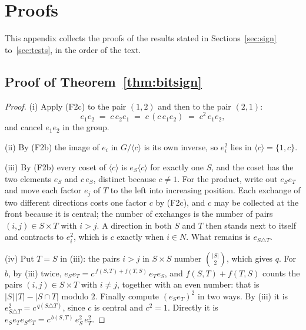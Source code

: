 \documentclass[11pt]{article}
\theoremstyle{plain}
\theoremstyle{definition}
\theoremstyle{plain}
\theoremstyle{definition}
\begin{document}
\appendix
\section{Proofs}\label{app:proofs}

This appendix collects the proofs of the results stated in Sections~\ref{sec:sign} to~\ref{sec:tests}, in the order of the text.

\subsection{\texorpdfstring{Proof of Theorem~\ref{thm:bitsign}}{Proof of Theorem 3.1}}\label{prf:thm:bitsign}

\begin{proof}
(i) Apply (F2c) to the pair $(1,2)$ and then to the pair $(2,1)$:
\[
e_{1}e_{2} \;=\; c\,e_{2}e_{1} \;=\; c\,(c\,e_{1}e_{2}) \;=\; c^{2}\,e_{1}e_{2} ,
\]
and cancel $e_{1}e_{2}$ in the group.

(ii) By (F2b) the image of $e_{i}$ in $G/\langle c\rangle$ is its own inverse, so $e_{i}^{2}$ lies in $\langle c \rangle = \{1, c\}$.

(iii) By (F2b) every coset of $\langle c \rangle$ is $e_{S}\langle c \rangle$ for exactly one $S$, and the coset has the two elements $e_{S}$ and $c\,e_{S}$, distinct because $c \neq 1$. For the product, write out $e_{S}e_{T}$ and move each factor $e_{j}$ of $T$ to the left into increasing position. Each exchange of two different directions costs one factor $c$ by (F2c), and $c$ may be collected at the front because it is central; the number of exchanges is the number of pairs $(i,j) \in S \times T$ with $i > j$. A direction in both $S$ and $T$ then stands next to itself and contracts to $e_{i}^{2}$, which is $c$ exactly when $i \in N$. What remains is $e_{S \triangle T}$.

(iv) Put $T = S$ in (iii): the pairs $i > j$ in $S \times S$ number $\binom{|S|}{2}$, which gives $q$. For $b$, by (iii) twice, $e_{S}e_{T} = c^{\,f(S,T) + f(T,S)}\,e_{T}e_{S}$, and $f(S,T) + f(T,S)$ counts the pairs $(i,j) \in S \times T$ with $i \neq j$, together with an even number: that is $|S|\,|T| - |S \cap T|$ modulo $2$. Finally compute $(e_{S}e_{T})^{2}$ in two ways. By (iii) it is $e_{S \triangle T}^{2} = c^{\,q(S \triangle T)}$, since $c$ is central and $c^{2} = 1$. Directly it is $e_{S}e_{T}e_{S}e_{T} = c^{\,b(S,T)}\,e_{S}^{2}\,e_{T}^{2}$.


\end{proof}
\end{document}
